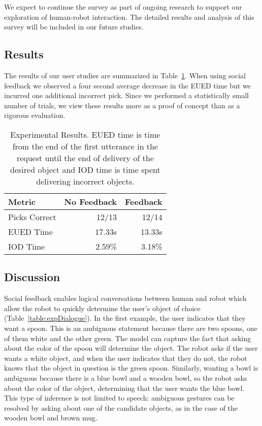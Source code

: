 \documentclass[letterpaper]{article}
\begin{document}
We expect to continue the survey as part of ongoing research to 
support our exploration of  human-robot interaction. The detailed results and
analysis of this survey will be included in our future studies.

\subsection{Results}

The results of our user studies are summarized in
Table~\ref{table:expResults}.  When using social feedback we observed a four
second average decrease in the EUED time but we incurred one additional
incorrect pick. Since we performed a statistically small number of trials, we
view these results more as a proof of concept than as a rigorous evaluation. 

\begin{table}
\begin{center}
\begin{tabular}{lrr}
\toprule
Metric & No Feedback & Feedback \\
\midrule
Picks Correct & 12/13 & 12/14\\
EUED Time & 17.33s & 13.33s\\
IOD Time & 2.59\% & 3.18\%\\
\bottomrule
\end{tabular}
\caption{\label{table:expResults} Experimental Results. EUED time is time from
the end of the first utterance in the request until the end of delivery of the
desired object and IOD time is time spent delivering incorrect objects.}
\end{center}
\end{table}

\subsection{Discussion}


Social feedback enables logical conversations between human and robot which allow the
robot to quickly determine the user's object of choice (Table~\ref{table:expDialogue}). 
In the first example, the user indicates that they want a spoon. This is an ambiguous statement
because there are two spoons, one of them white and the other green. The model can capture
the fact that asking about the color of the spoon will determine the object. The robot asks
if the user wants a white object, and when the user indicates that they do not, the robot
knows that the object in question is the green spoon. Similarly, wanting a bowl is ambiguous
because there is a blue bowl and a wooden bowl, so the robot asks about the color of the
object, determining that the user wants the blue bowl. This type of inference is not limited to
speech: ambiguous gestures can be resolved by asking about one of the candidate objects, as in the
case of the wooden bowl and brown mug.
\end{document}
